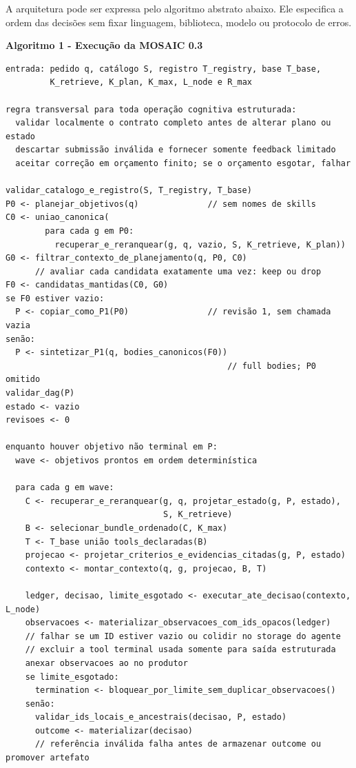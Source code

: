 \documentclass[12pt,a4paper]{article}
\begin{document}
A arquitetura pode ser expressa pelo algoritmo abstrato abaixo. Ele especifica a ordem das decisões sem fixar linguagem, biblioteca, modelo ou protocolo de erros.


\textbf{Algoritmo 1 - Execução da MOSAIC 0.3}

\begin{Verbatim}[breaklines=true,breakanywhere=true,fontsize=\small]
entrada: pedido q, catálogo S, registro T_registry, base T_base,
         K_retrieve, K_plan, K_max, L_node e R_max

regra transversal para toda operação cognitiva estruturada:
  validar localmente o contrato completo antes de alterar plano ou estado
  descartar submissão inválida e fornecer somente feedback limitado
  aceitar correção em orçamento finito; se o orçamento esgotar, falhar

validar_catalogo_e_registro(S, T_registry, T_base)
P0 <- planejar_objetivos(q)              // sem nomes de skills
C0 <- uniao_canonica(
        para cada g em P0:
          recuperar_e_reranquear(g, q, vazio, S, K_retrieve, K_plan))
G0 <- filtrar_contexto_de_planejamento(q, P0, C0)
      // avaliar cada candidata exatamente uma vez: keep ou drop
F0 <- candidatas_mantidas(C0, G0)
se F0 estiver vazio:
  P <- copiar_como_P1(P0)                // revisão 1, sem chamada vazia
senão:
  P <- sintetizar_P1(q, bodies_canonicos(F0))
                                             // full bodies; P0 omitido
validar_dag(P)
estado <- vazio
revisoes <- 0

enquanto houver objetivo não terminal em P:
  wave <- objetivos prontos em ordem determinística

  para cada g em wave:
    C <- recuperar_e_reranquear(g, q, projetar_estado(g, P, estado),
                                S, K_retrieve)
    B <- selecionar_bundle_ordenado(C, K_max)
    T <- T_base união tools_declaradas(B)
    projecao <- projetar_criterios_e_evidencias_citadas(g, P, estado)
    contexto <- montar_contexto(q, g, projecao, B, T)

    ledger, decisao, limite_esgotado <- executar_ate_decisao(contexto, L_node)
    observacoes <- materializar_observacoes_com_ids_opacos(ledger)
    // falhar se um ID estiver vazio ou colidir no storage do agente
    // excluir a tool terminal usada somente para saída estruturada
    anexar observacoes ao no produtor
    se limite_esgotado:
      termination <- bloquear_por_limite_sem_duplicar_observacoes()
    senão:
      validar_ids_locais_e_ancestrais(decisao, P, estado)
      outcome <- materializar(decisao)
      // referência inválida falha antes de armazenar outcome ou promover artefato


\end{Verbatim}
\end{document}
